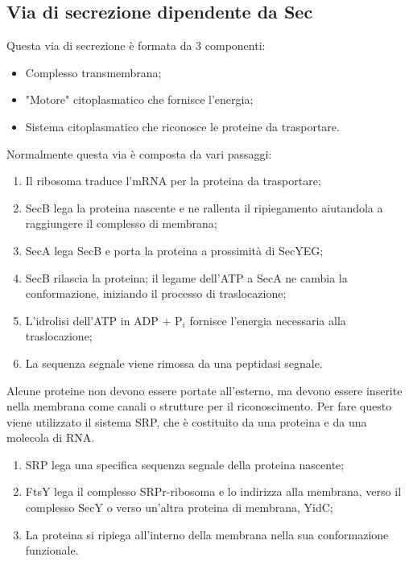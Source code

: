 \subsection{Via di secrezione dipendente da Sec}
Questa via di secrezione \`e formata da 3 componenti:
\begin{itemize}
    \item Complesso transmembrana; 
    \item "Motore" citoplasmatico che fornisce l'energia; 
    \item Sistema citoplasmatico che riconosce le proteine da trasportare.
\end{itemize}
Normalmente questa via \`e composta da vari passaggi: 
\begin{enumerate}
    \item Il ribosoma traduce l'mRNA per la proteina da trasportare; 
    \item SecB lega la proteina nascente e ne rallenta il ripiegamento aiutandola a raggiungere il complesso di membrana; 
    \item SecA lega SecB e porta la proteina a prossimit\`a di SecYEG; 
    \item SecB rilascia la proteina; il legame dell'ATP a SecA ne cambia la conformazione, iniziando il processo di traslocazione; 
    \item L'idrolisi dell'ATP in ADP + P$_i$ fornisce l'energia necessaria alla traslocazione;
    \item La sequenza segnale viene rimossa da una peptidasi segnale.
\end{enumerate}
Alcune proteine non devono essere portate all'esterno, ma devono essere inserite nella membrana come canali o strutture per il riconoscimento. Per fare questo viene utilizzato il sistema SRP, che \`e costituito da una proteina e da una molecola di RNA.
\begin{enumerate}
    \item SRP lega una specifica sequenza segnale della proteina nascente; 
    \item FtsY lega il complesso SRPr-ribosoma e lo indirizza alla membrana, verso il complesso SecY o verso un'altra proteina di membrana, YidC;
    \item La proteina si ripiega all'interno della membrana nella sua conformazione funzionale.
\end{enumerate}
